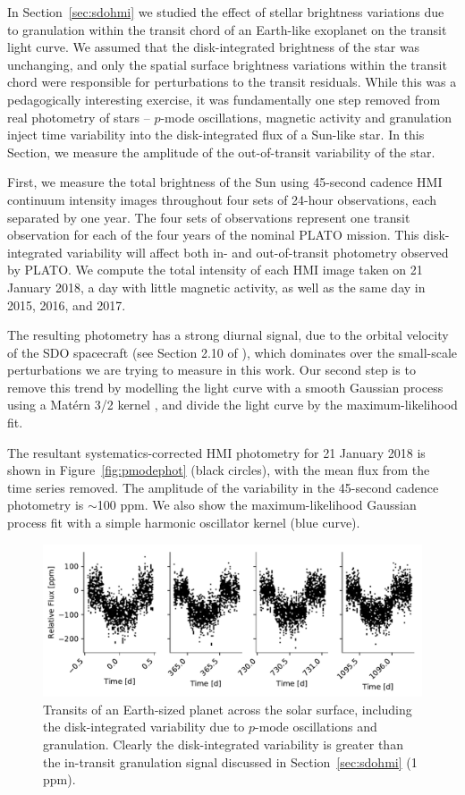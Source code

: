 In Section~\ref{sec:sdohmi} we studied the effect of stellar brightness variations due to granulation within the transit chord of an Earth-like exoplanet on the transit light curve. We assumed that the disk-integrated brightness of the star was unchanging, and only the spatial surface brightness variations within the transit chord were responsible for perturbations to the transit residuals. While this was a pedagogically interesting exercise, it was fundamentally one step removed from real photometry of stars -- $p$-mode oscillations, magnetic activity and granulation inject time variability into the disk-integrated flux of a Sun-like star. In this Section, we measure the amplitude of the out-of-transit variability of the star.

First, we measure the total brightness of the Sun using 45-second cadence HMI continuum intensity images throughout four sets of 24-hour observations, each separated by one year. The four sets of observations represent one transit observation for each of the four years of the nominal PLATO mission. This disk-integrated variability will affect both in- and out-of-transit photometry observed by PLATO. We compute the total intensity of each HMI image taken on 21 January 2018, a day with little magnetic activity, as well as the same day in 2015, 2016, and 2017. 

The resulting photometry has a strong diurnal signal, due to the orbital velocity of the SDO spacecraft (see Section 2.10 of \citealp{couvidat16}), which dominates over the small-scale perturbations we are trying to measure in this work. Our second step is to remove this trend by modelling the light curve with a smooth Gaussian process using a Mat{\'e}rn 3/2 kernel \citep{Rasmussen2006}, and divide the light curve by the maximum-likelihood fit.

The resultant systematics-corrected HMI photometry for 21 January 2018 is shown in Figure~\ref{fig:pmodephot} (black circles), with the mean flux from the time series removed. The amplitude of the variability in the 45-second cadence photometry is $\sim$100 ppm. We also show the maximum-likelihood Gaussian process fit with a simple harmonic oscillator kernel (blue curve). 

\begin{figure}
    \centering
    \includegraphics[scale=0.75]{stash/transits.pdf}
    \caption{Transits of an Earth-sized planet across the solar surface, including the disk-integrated variability due to $p$-mode oscillations and granulation. Clearly the disk-integrated variability is greater than the in-transit granulation signal discussed in Section~\ref{sec:sdohmi} (1 ppm).}
    \label{fig:transitphotometry}
\end{figure}

